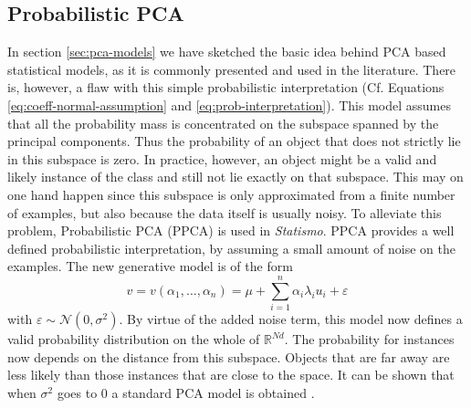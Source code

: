 \documentclass{InsightArticle}
\newcommand{\Statismo}{\emph{Statismo}\xspace}
\def\R{\mathds{R}} %
\begin{document}

\subsection{Probabilistic PCA}
In section \ref{sec:pca-models} we have sketched the basic idea behind
PCA based statistical models, as it is commonly presented and used in the
literature.  There is, however, a flaw with this simple probabilistic
interpretation (Cf. Equations \eqref{eq:coeff-normal-assumption} and
\eqref{eq:prob-interpretation}).  This model assumes that all the
probability mass is concentrated on the subspace spanned by the
principal components.  Thus the probability of an object that does
not strictly lie in this subspace is zero. In practice, however, an object might be a valid and likely instance of the class and 
still not lie exactly on that subspace. This may on one hand happen since this subspace is only approximated from a finite number of examples, 
but also because the data itself is usually noisy.
 To alleviate this
problem, Probabilistic PCA (PPCA) \cite{tipping_probabilistic_1999} is used in \Statismo.
PPCA  provides a well defined probabilistic interpretation, by assuming
a small amount of noise on the examples. The new generative
model is of the form
\[
v = v(\alpha_1, \ldots, \alpha_n) = \mu  + \sum_{i=1}^n \alpha_i \lambda_i u_i + \varepsilon
\]
with $\varepsilon \sim \mathcal{N}(0, \sigma^2)$.  By virtue of the
added noise term, this model now defines a valid probability distribution
on the whole of $\R^{Nd}$. The probability for instances now depends
on the distance from this subspace. Objects that are far away are less
likely than those instances that are close to the space.  It can be
shown that when $\sigma^2$ goes to $0$ a standard PCA model is
obtained \cite{roweis_em_1998}.
\end{document}
